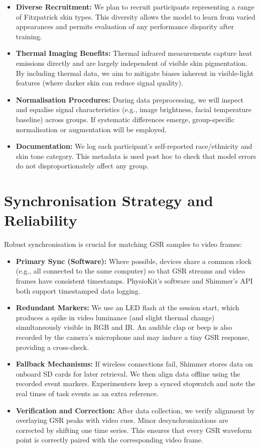 \documentclass{article}
\begin{document}
\begin{itemize}
    \item \textbf{Diverse Recruitment:} We plan to recruit participants representing a range of Fitzpatrick skin types. This diversity allows the model to learn from varied appearances and permits evaluation of any performance disparity after training.
    \item \textbf{Thermal Imaging Benefits:} Thermal infrared measurements capture heat emissions directly and are largely independent of visible skin pigmentation. By including thermal data, we aim to mitigate biases inherent in visible-light features (where darker skin can reduce signal quality).
    \item \textbf{Normalisation Procedures:} During data preprocessing, we will inspect and equalise signal characteristics (e.g., image brightness, facial temperature baseline) across groups. If systematic differences emerge, group-specific normalisation or augmentation will be employed.
    \item \textbf{Documentation:} We log each participant's self-reported race/ethnicity and skin tone category. This metadata is used post hoc to check that model errors do not disproportionately affect any group.
\end{itemize}

\section{Synchronisation Strategy and Reliability}

Robust synchronisation is crucial for matching GSR samples to video frames:

\begin{itemize}
    \item \textbf{Primary Sync (Software):} Where possible, devices share a common clock (e.g., all connected to the same computer) so that GSR streams and video frames have consistent timestamps. PhysioKit's software and Shimmer's API both support timestamped data logging.
    \item \textbf{Redundant Markers:} We use an LED flash at the session start, which produces a spike in video luminance (and slight thermal change) simultaneously visible in RGB and IR. An audible clap or beep is also recorded by the camera's microphone and may induce a tiny GSR response, providing a cross-check.
    \item \textbf{Fallback Mechanisms:} If wireless connections fail, Shimmer stores data on onboard SD cards for later retrieval. We then align data offline using the recorded event markers. Experimenters keep a synced stopwatch and note the real times of task events as an extra reference.
    \item \textbf{Verification and Correction:} After data collection, we verify alignment by overlaying GSR peaks with video cues. Minor desynchronizations are corrected by shifting one time series. This ensures that every GSR waveform point is correctly paired with the corresponding video frame.
\end{itemize}
\end{document}
